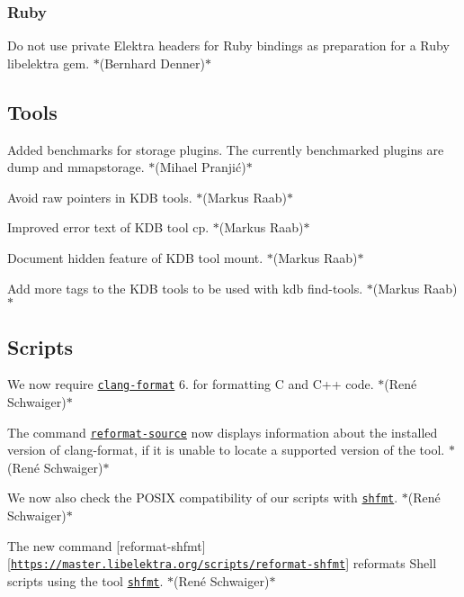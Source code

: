 \subsubsection*{Ruby}

Do not use private Elektra headers for Ruby bindings as preparation for a Ruby {\ttfamily libelektra} gem. $\ast$(Bernhard Denner)$\ast$

\subsection*{Tools}


\begin{DoxyItemize}
\item Added benchmarks for storage plugins. The currently benchmarked plugins are {\ttfamily dump} and {\ttfamily mmapstorage}. $\ast$(Mihael Pranjić)$\ast$
\item Avoid raw pointers in K\+DB tools. $\ast$(Markus Raab)$\ast$
\item Improved error text of K\+DB tool {\ttfamily cp}. $\ast$(Markus Raab)$\ast$
\item Document hidden feature of K\+DB tool {\ttfamily mount}. $\ast$(Markus Raab)$\ast$
\item Add more tags to the K\+DB tools to be used with {\ttfamily kdb find-\/tools}. $\ast$(Markus Raab)$\ast$
\end{DoxyItemize}

\subsection*{Scripts}


\begin{DoxyItemize}
\item We now require \href{https://clang.llvm.org/docs/ClangFormat.html}{\tt {\ttfamily clang-\/format}} 6. for formatting C and C++ code. $\ast$(René Schwaiger)$\ast$
\item The command \href{https://master.libelektra.org/scripts/reformat-source}{\tt {\ttfamily reformat-\/source}} now displays information about the installed version of {\ttfamily clang-\/format}, if it is unable to locate a supported version of the tool. $\ast$(René Schwaiger)$\ast$
\item We now also check the P\+O\+S\+IX compatibility of our scripts with \href{https://github.com/mvdan/sh}{\tt {\ttfamily shfmt}}. $\ast$(René Schwaiger)$\ast$
\item The new command \mbox{[}{\ttfamily reformat-\/shfmt}\mbox{]}\mbox{[}\href{https://master.libelektra.org/scripts/reformat-shfmt}{\tt https\+://master.\+libelektra.\+org/scripts/reformat-\/shfmt}\mbox{]} reformats Shell scripts using the tool \href{https://github.com/mvdan/sh}{\tt {\ttfamily shfmt}}. $\ast$(René Schwaiger)$\ast$
\end{DoxyItemize}


